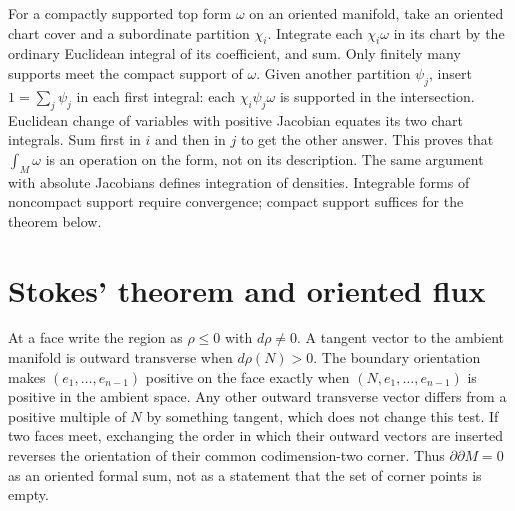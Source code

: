 For a compactly supported top form $\omega$ on an oriented manifold, take an oriented chart cover and a subordinate partition $\chi_i$. Integrate each $\chi_i\omega$ in its chart by the ordinary Euclidean integral of its coefficient, and sum. Only finitely many supports meet the compact support of $\omega$. Given another partition $\psi_j$, insert $1=\sum_j\psi_j$ in each first integral: each $\chi_i\psi_j\omega$ is supported in the intersection. Euclidean change of variables with positive Jacobian equates its two chart integrals. Sum first in $i$ and then in $j$ to get the other answer. This proves that $\int_M\omega$ is an operation on the form, not on its description. The same argument with absolute Jacobians defines integration of densities. Integrable forms of noncompact support require convergence; compact support suffices for the theorem below.

\section{Stokes' theorem and oriented flux}
At a face write the region as $\rho\le0$ with $d\rho\ne0$. A tangent vector to the ambient manifold is outward transverse when $d\rho(N)>0$. The boundary orientation makes $(e_1,\ldots,e_{n-1})$ positive on the face exactly when $(N,e_1,\ldots,e_{n-1})$ is positive in the ambient space. Any other outward transverse vector differs from a positive multiple of $N$ by something tangent, which does not change this test. If two faces meet, exchanging the order in which their outward vectors are inserted reverses the orientation of their common codimension-two corner. Thus $\partial\partial M=0$ as an oriented formal sum, not as a statement that the set of corner points is empty.

